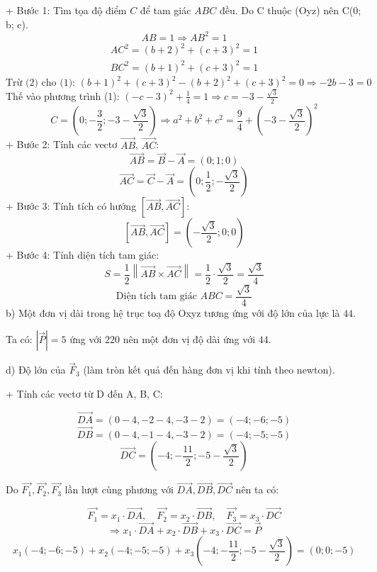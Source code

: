 \documentclass[a4paper,12pt]{article}
\begin{document}
+ Bước 1: Tìm tọa độ điểm \(C\) để tam giác \(ABC\) đều.
Do C thuộc (Oyz) nên C(0; b; c).
\[ AB = 1 \Rightarrow AB^2 = 1 \]
\begin{align}
AC^2 = (b +2)^2 + (c +3)^2 = 1 \tag{1} \\
BC^2 = (b +1)^2 + (c +3)^2 = 1 \tag{2}
\end{align}
\[\text{Trừ (2) cho (1): }(b + 1)^2 + (c + 3)^2 - (b + 2)^2 + (c + 3)^2 = 0 \Rightarrow - 2 b - 3 = 0\]
Thế vào phương trình (1): \(\left(- c - 3\right)^{2} + \frac{1}{4} = 1 \Rightarrow c=-3 - \frac{\sqrt{3}}{2}\)
\[C = (0; - \frac{3}{2}; -3 - \frac{\sqrt{3}}{2}) \Rightarrow a^2+b^2+c^2=\frac{9}{4} + \left(-3 - \frac{\sqrt{3}}{2}\right)^{2}\]
+ Bước 2: Tính các vectơ \(\overrightarrow{AB}\), \(\overrightarrow{AC}\):
\[ \overrightarrow{AB} = \overrightarrow{B} - \overrightarrow{A} = (0; 1; 0) \]
\[ \overrightarrow{AC} = \overrightarrow{C} - \overrightarrow{A} = (0; \frac{1}{2}; - \frac{\sqrt{3}}{2}) \]
+ Bước 3: Tính tích có hướng \(\left[\overrightarrow{AB}, \overrightarrow{AC}\right]\):
\[ [\overrightarrow{AB},  \overrightarrow{AC}] = (- \frac{\sqrt{3}}{2}; 0; 0) \]
+ Bước 4: Tính diện tích tam giác:
\[
S = \frac{1}{2} \left\| \overrightarrow{AB} \times \overrightarrow{AC} \right\| = \frac{1}{2} \cdot \frac{\sqrt{3}}{2}
= \frac{\sqrt{3}}{4}
\]
\[\text{Diện tích tam giác } ABC = \frac{\sqrt{3}}{4}\]
b) Một đơn vị dài trong hệ trục toạ độ Oxyz tương ứng với độ lớn của lực là \(44\).


Ta có: \(|\overrightarrow{P}| = 5\) ứng với \(220\) nên một đơn vị độ dài ứng với \(44\).




d) Độ lớn của \(\overrightarrow{F}_3\) (làm tròn kết quả đến hàng đơn vị khi tính theo newton).


+ Tính các vectơ từ D đến A, B, C:


\[ \overrightarrow{DA} = (0 - 4, -2 - 4, -3 - 2) = (-4; -6; -5) \]
\[ \overrightarrow{DB} = (0 - 4, -1 - 4, -3 - 2) = (-4; -5; -5) \]
\[ \overrightarrow{DC} = (-4; - \frac{11}{2}; -5 - \frac{\sqrt{3}}{2}) \]


Do \(\overrightarrow{F_1},\overrightarrow{F_2}, \overrightarrow{F_3}\) lần lượt cùng phương với \(\overrightarrow{DA}, \overrightarrow{DB}, \overrightarrow{DC}\) nên ta có:


\[ \overrightarrow{F_1} = x_1 \cdot \overrightarrow{DA},\quad \overrightarrow{F_2} = x_2 \cdot \overrightarrow{DB},\quad \overrightarrow{F_3} = x_3 \cdot \overrightarrow{DC} \]
\[ \Rightarrow x_1 \cdot \overrightarrow{DA} + x_2 \cdot \overrightarrow{DB} + x_3 \cdot \overrightarrow{DC} = \overrightarrow{P} \]
\[ x_1(-4; -6; -5) + x_2(-4; -5; -5) + x_3(-4; - \frac{11}{2}; -5 - \frac{\sqrt{3}}{2}) = (0; 0; -5) \]
\end{document}
